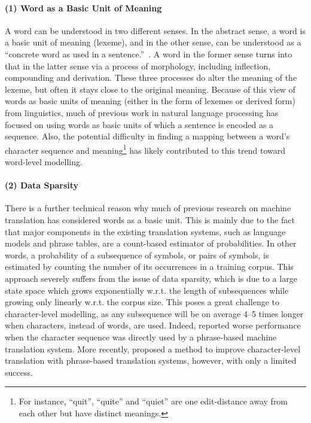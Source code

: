 \documentclass[11pt]{article}
\begin{document}
\paragraph{(1) Word as a Basic Unit of Meaning}
A word can be understood in two different senses. In the abstract sense, a word
is a basic unit of meaning (lexeme), and in the other sense, can be understood
as a ``concrete word as used in a sentence.''~\cite{booij2012grammar}. A word in
the former sense turns into that in the latter sense via a process of
morphology, including inflection, compounding and derivation. These three
processes do alter the meaning of the lexeme, but often it stays close to the
original meaning.
Because of this view of words as basic units of meaning (either in the form of
lexemes or derived form) from linguistics, much of previous work in natural
language processing has focused on using words as basic units of which a
sentence is encoded as a sequence. Also, the potential difficulty in finding a
mapping between a word's character sequence and meaning\footnote{
    For instance, ``quit'', ``quite'' and ``quiet'' are one edit-distance away
    from each other but have distinct meanings.
}
has likely contributed to this trend toward word-level modelling.

\paragraph{(2) Data Sparsity}
There is a further technical reason why much of previous research on machine
translation has considered words as a basic unit. This is mainly due to the fact
that major components in the existing translation systems, such as language
models and phrase tables, are a count-based estimator of probabilities. In other
words, a probability of a subsequence of symbols, or pairs of symbols, is
estimated by counting the number of its occurrences in a training corpus. This
approach severely suffers from the issue of data sparsity, which is due to a
large state space which grows exponentially w.r.t. the length of subsequences
while growing only linearly w.r.t. the corpus size.
This poses a great challenge to character-level modelling, as any subsequence
will be on average 4--5 times longer when characters, instead of words, are
used. Indeed,  reported worse performance when the
character sequence was directly used by a phrase-based machine translation
system. More recently,  proposed a method
to improve character-level translation with phrase-based translation systems,
however, with only a limited success. 
\end{document}
